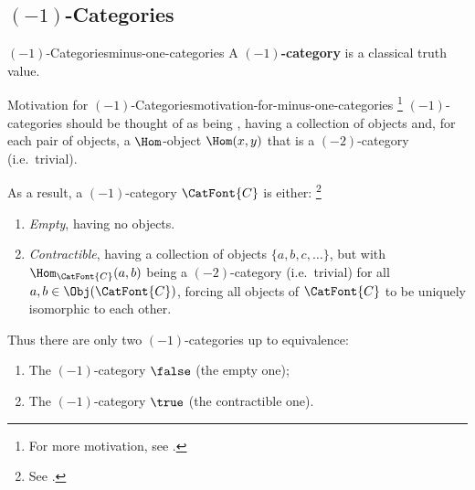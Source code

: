 \subsection{$(-1)$-Categories}\label{subsection-minus-one-categories}
\begin{definition}{$(-1)$-Categories}{minus-one-categories}%
    A \textbf{$(-1)$-category} is a classical truth value.%
\end{definition}
\begin{remark}{Motivation for $(-1)$-Categories}{motivation-for-minus-one-categories}%
    \footnote{%
        For more motivation, see \cite[p.~13]{lectures-on-n-categories-and-cohomology}.
    }%
    $(-1)$-categories should be thought of as being , having a collection of objects and, for each pair of objects, a $\Hom$-object $\Hom(x,y)$ that is a $(-2)$-category (i.e.\ trivial).%

    \indent As a result, a $(-1)$-category $\CatFont{C}$ is either:%
    \footnote{%
        See \cite[pp.~33--34]{lectures-on-n-categories-and-cohomology}.
        \par\vspace*{\TCBBoxCorrection}
    }%
    \begin{enumerate}
        \item\label{motivation-for-minus-one-categories-empty}\emph{Empty}, having no objects.
        \item\label{motivation-for-minus-one-categories-contractible}\emph{Contractible}, having a collection of objects $\{a,b,c,\ldots\}$, but with $\Hom_{\CatFont{C}}(a,b)$ being a $(-2)$-category (i.e.\ trivial) for all $a,b\in\Obj(\CatFont{C})$, forcing all objects of $\CatFont{C}$ to be uniquely isomorphic to each other.
    \end{enumerate}
    Thus there are only two $(-1)$-categories up to equivalence:
    \begin{enumerate}
        \item\label{motivation-for-minus-one-categories-false}The $(-1)$-category $\false$ (the empty one);
        \item\label{motivation-for-minus-one-categories-true}The $(-1)$-category $\true$  (the contractible one).%
    \end{enumerate}
\end{remark}
